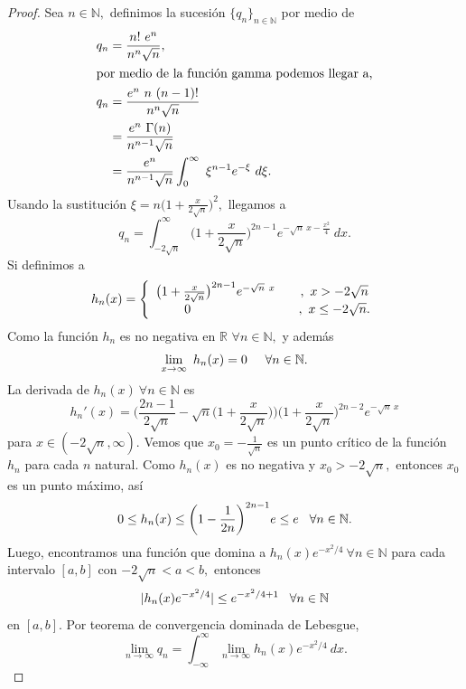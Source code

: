 \begin{proof}
	Sea $n \in \mathbb{N},$ definimos la sucesión $\{q_n\}_{n \in \mathbb{N}}$ por medio de
	\begin{align*}
		q_n &= \frac{n!\ e^n}{n^n\sqrt{n}},\\
		\intertext{por medio de la función gamma podemos llegar a,}
		q_n &= \frac{e^n\ n\ (n-1)!}{n^n\sqrt{n}}\\
		&= \frac{e^n\ \Gamma(n)}{n^{n-1}\sqrt{n}}\\
		&= \frac{e^n}{n^{n-1}\sqrt{n}}\int_{0}^{\infty}\ \xi^{n-1}e^{-\xi}\ d\xi.
	\end{align*}
	Usando la sustitución $\xi = n\big(1+\frac{x}{2\sqrt{n}}\big)^2,$ llegamos a $$q_n = \int_{-2\sqrt{n}}^{\infty}\bigg(1+\frac{x}{2\sqrt{n}}\bigg)^{2n-1}e^{-\sqrt{n}\ x-\frac{x^2}{4}}\ dx.$$
	Si definimos a \[h_n(x) = \left\{
	\begin{array}{lcl}
	\big(1+\frac{x}{2\sqrt{n}}\big)^{2n-1}e^{-\sqrt{n}\ x}\hspace{0.3cm}&,\ x > -2\sqrt{n}\\
	\hspace{0.8cm}0 &,\ x \leq -2\sqrt{n}.
	\end{array}
	\right.\]
	Como la función $h_n$ es no negativa en $\mathbb{R}$ $\forall n \in \mathbb{N},$ y además $$\lim_{x \rightarrow \infty}\ h_n(x) = 0\hspace{0.5cm}\forall n \in \mathbb{N}.$$
	La derivada de $h_n(x)\ \forall n \in \mathbb{N}$ es $$h_n'(x) = \bigg(\frac{2n-1}{2\sqrt{n}}-\sqrt{n}\bigg(1+\frac{x}{2\sqrt{n}}\bigg)\bigg)\bigg(1+\frac{x}{2\sqrt{n}}\bigg)^{2n-2}e^{-\sqrt{n}\ x}$$
	para $x \in (-2\sqrt{n},\infty).$ Vemos que $x_0 = -\frac{1}{\sqrt{n}}$ es un punto crítico de la función $h_n$ para cada $n$ natural. Como $h_n(x)$ es no negativa y $x_0 > -2\sqrt{n},$ entonces $x_0$ es un punto máximo, así $$0 \leq h_n(x) \leq \bigg(1-\frac{1}{2n}\bigg)^{2n-1}e \leq e\hspace{0.3cm}\forall n \in \mathbb{N}.$$
	Luego, encontramos una función que domina a $h_n(x)e^{-x^2/4}\ \forall n \in \mathbb{N}$ para cada intervalo $[a,b]$ con $-2\sqrt{n} < a < b,$ entonces $$|h_n(x)e^{-x^2/4}| \leq e^{-x^2/4+1}\hspace{0.3cm}\forall n \in \mathbb{N}$$ en $[a,b].$ Por teorema de convergencia dominada de Lebesgue, $$\lim_{n \rightarrow \infty}q_n = \int_{-\infty}^{\infty}\lim_{n \rightarrow \infty}h_n(x)e^{-x^2/4}\ dx.$$
	

\end{proof}
